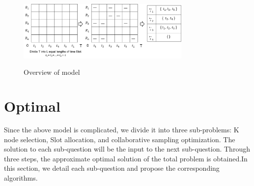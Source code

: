 \documentclass[conference]{IEEEtran}
\begin{document}
 

\begin{figure}[!!!!!!!!!!!!!!hhhhhhhhhht]
\centering

\includegraphics[width=8.5cm]{images/slot_num_order.png}
\label{fig_1_slot}

\caption{Overview of model}
\label{fig_1_model}
\end{figure}



\section{Optimal}
Since the above model is complicated, we divide it into three sub-problems: K node selection, Slot allocation, and collaborative sampling optimization. The solution to each sub-question will be the input to the next sub-question. Through three steps, the approximate optimal solution of the total problem is obtained.In this section, we detail each sub-question and propose the corresponding algorithms.
\end{document}
